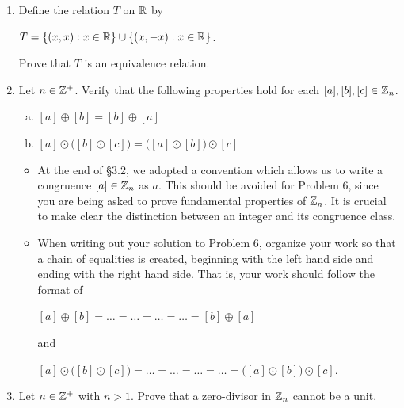 \documentclass[11pt,fleqn,dvipsnames,usenames]{article}
\begin{document}
\begin{enumerate}
\item Define the relation $T$ on $\mathbb{R}$ by
\begin{center}
$T = \left\{(x,x): x\in\mathbb{R}\right\}\cup \left\{(x,-x): x\in\mathbb{R}\right\}$.
\end{center}
Prove that $T$ is an equivalence relation.

\item Let $n\in\mathbb{Z}^{+}$.  Verify that the following properties hold for each $[a],[b],[c]\in\mathbb{Z}_n$.
\vsmsp

\begin{enumerate}[(a)]
\item $[a] \oplus [b] = [b]\oplus [a]$
\item $[a] \odot \big([b] \odot [c]\big) = \big([a] \odot [b]\big)\odot [c]$
\end{enumerate}

\notes
\begin{itemize}
\item At the end of \S3.2, we adopted a convention which allows us to write a congruence $[a]\in\mathbb{Z}_n$ as $a$.  This should be avoided for Problem 6, since you are being asked to prove fundamental properties of $\mathbb{Z}_n$.  It is crucial to make clear the distinction between an integer and its congruence class.
\item When writing out your solution to Problem 6, organize your work so that a chain of equalities is created, beginning with the left hand side and ending with the right hand side.  That is, your work should follow the format of
\begin{center}
$[a]\oplus [b] = \ldots = \ldots = \ldots = \ldots = [b] \oplus [a]$
\end{center}
and
\begin{center}
$[a] \odot \big([b] \odot [c]\big) = \ldots = \ldots = \ldots = \ldots = \big([a] \odot [b]\big)\odot [c]$.
\end{center}
\end{itemize}
\item Let $n\in\mathbb{Z}^+$ with $n > 1$.  Prove that a zero-divisor in $\mathbb{Z}_n$ cannot be a unit.

\end{enumerate}
\end{document}
